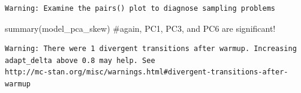 \documentclass[
  letterpaper,
  DIV=11,
  numbers=noendperiod]{scrartcl}
\newenvironment{Shaded}{\begin{snugshade}}{\end{snugshade}}
\newcommand{\CommentTok}[1]{\textcolor[rgb]{0.37,0.37,0.37}{#1}}
\newcommand{\FunctionTok}[1]{\textcolor[rgb]{0.28,0.35,0.67}{#1}}
\newcommand{\NormalTok}[1]{\textcolor[rgb]{0.00,0.23,0.31}{#1}}
\begin{document}
\begin{verbatim}
Warning: Examine the pairs() plot to diagnose sampling problems
\end{verbatim}

\begin{Shaded}
\begin{Highlighting}[]
\FunctionTok{summary}\NormalTok{(model\_pca\_skew) }\CommentTok{\#again, PC1, PC3, and PC6 are significant! }
\end{Highlighting}
\end{Shaded}

\begin{verbatim}
Warning: There were 1 divergent transitions after warmup. Increasing
adapt_delta above 0.8 may help. See
http://mc-stan.org/misc/warnings.html#divergent-transitions-after-warmup
\end{verbatim}
\end{document}
